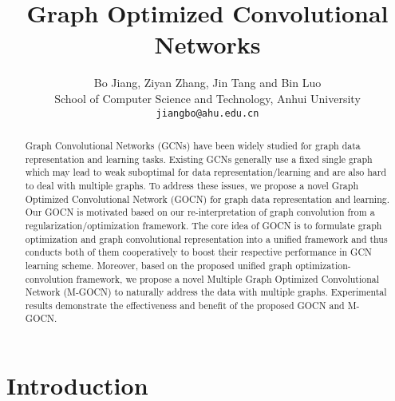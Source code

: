 \documentclass{article}
\title{Graph Optimized Convolutional Networks}
\author{
  Bo Jiang, Ziyan Zhang, Jin Tang and Bin Luo\\
  School of Computer Science and Technology, Anhui University\\
  \texttt{jiangbo@ahu.edu.cn} \\
}
\begin{document}
\maketitle

\begin{abstract}
Graph Convolutional Networks (GCNs) have been widely studied for graph data representation and learning tasks.
Existing GCNs generally  use a fixed single graph which may lead to weak suboptimal for data representation/learning and are also hard to deal with multiple graphs.
To address these issues, we propose a novel Graph Optimized Convolutional Network (GOCN) for graph data representation and learning.
Our GOCN is motivated based on our re-interpretation of graph convolution from a regularization/optimization framework.
The core idea of GOCN is to formulate  graph optimization and graph convolutional representation into a
unified framework and thus conducts both of them cooperatively to boost their respective performance in GCN  learning scheme.
Moreover, based on the proposed unified graph optimization-convolution framework, we propose  a novel Multiple Graph Optimized Convolutional Network (M-GOCN) to naturally address the data with multiple graphs. 
Experimental results  demonstrate the effectiveness and benefit of the proposed GOCN and M-GOCN.
\end{abstract}

\section{Introduction}
\end{document}
